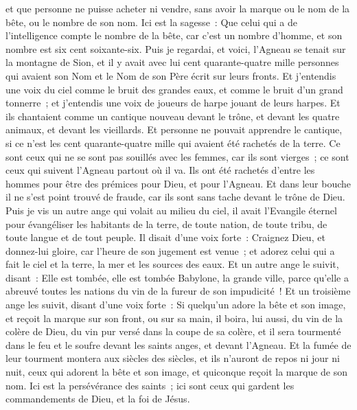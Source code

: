 \begin{multicols}{2}
et que personne ne puisse acheter ni vendre, sans avoir la marque ou le nom de la bête, ou le nombre de son nom.
Ici est la sagesse~: Que celui qui a de l'intelligence compte le nombre de la bête, car c'est un nombre d'homme, et son nombre est six cent soixante-six.
\VerseOne{}Puis je regardai, et voici, l'Agneau se tenait sur la montagne de Sion, et il y avait avec lui cent quarante-quatre mille personnes qui avaient son Nom et le Nom de son Père écrit sur leurs fronts.
Et j'entendis une voix du ciel comme le bruit des grandes eaux, et comme le bruit d'un grand tonnerre~; et j'entendis une voix de joueurs de harpe jouant de leurs harpes.
Et ils chantaient comme un cantique nouveau devant le trône, et devant les quatre animaux, et devant les vieillards. Et personne ne pouvait apprendre le cantique, si ce n'est les cent quarante-quatre mille qui avaient été rachetés de la terre.
Ce sont ceux qui ne se sont pas souillés avec les femmes, car ils sont vierges~; ce sont ceux qui suivent l'Agneau partout où il va. Ils ont été rachetés d'entre les hommes pour être des prémices pour Dieu, et pour l'Agneau.
Et dans leur bouche il ne s'est point trouvé de fraude, car ils sont sans tache devant le trône de Dieu.
Puis je vis un autre ange qui volait au milieu du ciel, il avait l'Evangile éternel pour évangéliser les habitants de la terre, de toute nation, de toute tribu, de toute langue et de tout peuple.
Il disait d'une voix forte~: Craignez Dieu, et donnez-lui gloire, car l'heure de son jugement est venue~; et adorez celui qui a fait le ciel et la terre, la mer et les sources des eaux.
Et un autre ange le suivit, disant~: Elle est tombée, elle est tombée Babylone, la grande ville, parce qu'elle a abreuvé toutes les nations du vin de la fureur de son impudicité~!
Et un troisième ange les suivit, disant d'une voix forte~: Si quelqu'un adore la bête et son image, et reçoit la marque sur son front, ou sur sa main,
il boira, lui aussi, du vin de la colère de Dieu, du vin pur versé dans la coupe de sa colère, et il sera tourmenté dans le feu et le soufre devant les saints anges, et devant l'Agneau.
Et la fumée de leur tourment montera aux siècles des siècles, et ils n'auront de repos ni jour ni nuit, ceux qui adorent la bête et son image, et quiconque reçoit la marque de son nom.
Ici est la persévérance des saints~; ici sont ceux qui gardent les commandements de Dieu, et la foi de Jésus.

\end{multicols}
